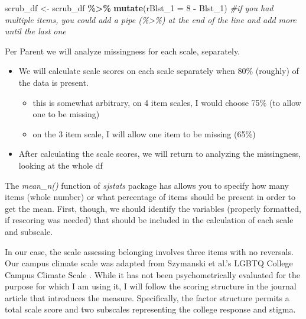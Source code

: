\documentclass[
  11pt,
]{book}
\newenvironment{Shaded}{\begin{snugshade}}{\end{snugshade}}
\newcommand{\AttributeTok}[1]{\textcolor[rgb]{0.27,0.27,0.27}{#1}}
\newcommand{\CommentTok}[1]{\textcolor[rgb]{0.37,0.37,0.37}{\textit{#1}}}
\newcommand{\DecValTok}[1]{\textcolor[rgb]{0.06,0.06,0.06}{#1}}
\newcommand{\FunctionTok}[1]{\textcolor[rgb]{0.27,0.27,0.27}{\textbf{#1}}}
\newcommand{\NormalTok}[1]{#1}
\newcommand{\OtherTok}[1]{\textcolor[rgb]{0.37,0.37,0.37}{#1}}
\newcommand{\SpecialCharTok}[1]{\textcolor[rgb]{0.43,0.43,0.43}{\textbf{#1}}}
\providecommand{\tightlist}{%
  \setlength{\itemsep}{0pt}\setlength{\parskip}{0pt}}
\begin{document}
\begin{Shaded}
\begin{Highlighting}[]
\NormalTok{scrub\_df }\OtherTok{\textless{}{-}}\NormalTok{ scrub\_df }\SpecialCharTok{\%\textgreater{}\%}
    \FunctionTok{mutate}\NormalTok{(}\AttributeTok{rBlst\_1 =} \DecValTok{8} \SpecialCharTok{{-}}\NormalTok{ Blst\_1)  }\CommentTok{\#if you had multiple items, you could add a pipe (\%\textgreater{}\%) at the end of the line and add more until the last one}
\end{Highlighting}
\end{Shaded}

Per Parent \citeyearpar{parent_handling_2013} we will analyze missingness for each scale, separately.

\begin{itemize}
\tightlist
\item
  We will calculate scale scores on each scale separately when 80\% (roughly) of the data is present.

  \begin{itemize}
  \tightlist
  \item
    this is somewhat arbitrary, on 4 item scales, I would choose 75\% (to allow one to be missing)
  \item
    on the 3 item scale, I will allow one item to be missing (65\%)
  \end{itemize}
\item
  After calculating the scale scores, we will return to analyzing the missingness, looking at the whole df
\end{itemize}

The \emph{mean\_n()} function of \emph{sjstats} package has allows you to specify how many items (whole number) or what percentage of items should be present in order to get the mean. First, though, we should identify the variables (properly formatted, if rescoring was needed) that should be included in the calculation of each scale and subscale.

In our case, the scale assessing belonging \citep{bollen_perceived_1990, hurtado_effects_1997} involves three items with no reversals. Our campus climate scale was adapted from Szymanski et al.'s LGBTQ College Campus Climate Scale \citep{szymanski_perceptions_2020}. While it has not been psychometrically evaluated for the purpose for which I am using it, I will follow the scoring structure in the journal article that introduces the measure. Specifically, the factor structure permits a total scale score and two subscales representing the college response and stigma.
\end{document}

